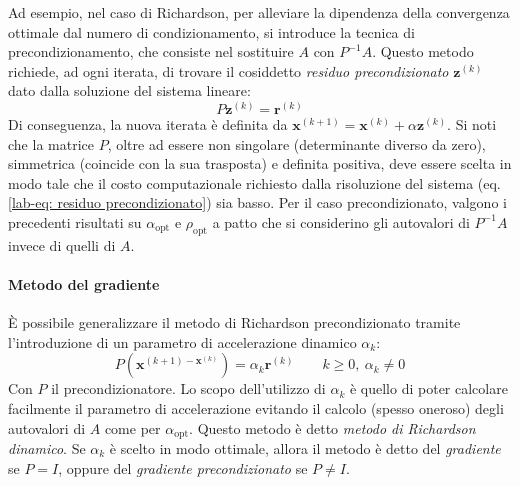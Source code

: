 \highspace
Ad esempio, nel caso di Richardson, per alleviare la dipendenza della convergenza ottimale dal numero di condizionamento, si introduce la tecnica di precondizionamento, che consiste nel sostituire $A$ con $P^{-1}A$. Questo metodo richiede, ad ogni iterata, di trovare il cosiddetto \emph{residuo precondizionato} $\mathbf{z}^{\left(k\right)}$ dato dalla soluzione del sistema lineare:
\begin{equation}\label{lab-eq: residuo precondizionato}
    P\mathbf{z}^{\left(k\right)} = \mathbf{r}^{\left(k\right)}
\end{equation}
Di conseguenza, la nuova iterata è definita da $\mathbf{x}^{\left(k+1\right)} = \mathbf{x}^{\left(k\right)} + \alpha\mathbf{z}^{\left(k\right)}$. Si noti che la matrice $P$, oltre ad essere non singolare (determinante diverso da zero), simmetrica (coincide con la sua trasposta) e definita positiva, deve essere scelta in modo tale che il costo computazionale richiesto dalla risoluzione del sistema (eq. \ref{lab-eq: residuo precondizionato}) sia basso. Per il caso precondizionato, valgono i precedenti risultati su $\alpha_{\text{opt}}$ e $\rho_{\text{opt}}$ a patto che si considerino gli autovalori di $P^{-1} A$ invece di quelli di $A$.

\longline

\paragraph{Metodo del gradiente}

È possibile generalizzare il metodo di Richardson precondizionato tramite l'introduzione di un parametro di accelerazione dinamico $\alpha_{k}$:
\begin{equation*}
    P\left(\mathbf{x}^{\left(k+1\right) - \mathbf{x}^{\left(k\right)}}\right) = \alpha_{k}\mathbf{r}^{\left(k\right)} \hspace{2em} k \ge 0, \: \alpha_{k} \ne 0
\end{equation*}
Con $P$ il precondizionatore. Lo scopo dell'utilizzo di $\alpha_{k}$ è quello di poter calcolare facilmente il parametro di accelerazione evitando il calcolo (spesso oneroso) degli autovalori di $A$ come per $\alpha_{\text{opt}}$. Questo metodo è detto \emph{metodo di Richardson dinamico}. Se $\alpha_{k}$ è scelto in modo ottimale, allora il metodo è detto del \emph{gradiente} se $P = I$, oppure del \emph{gradiente precondizionato} se $P \ne I$.

